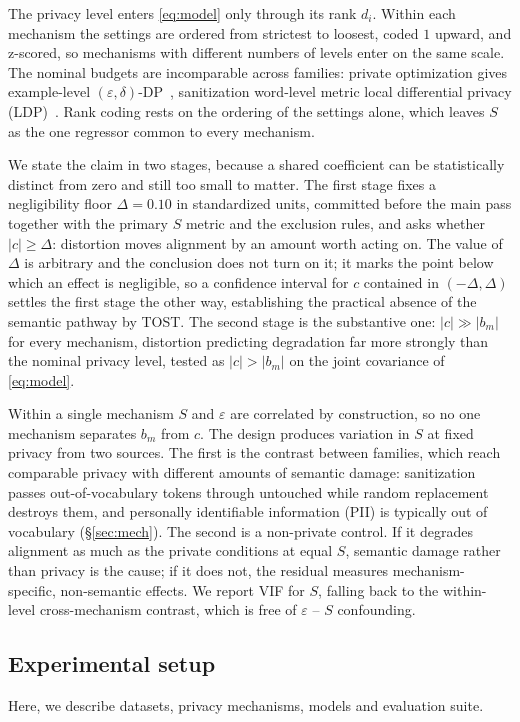 The privacy level enters \eqref{eq:model} only through its rank $d_i$.
Within each mechanism the settings are ordered from strictest to loosest,
coded $1$ upward,
and z-scored,
so mechanisms with different numbers of levels enter on the same scale.
The nominal budgets are incomparable across families:
private optimization gives example-level $(\varepsilon, \delta)$-DP~\citep{abadi2016deep},
sanitization word-level metric local differential privacy (LDP)~\citep{chatzikokolakis2013broadening}.
Rank coding rests on the ordering of the settings alone,
which leaves $S$ as the one regressor common to every mechanism.

We state the claim in two stages,
because a shared coefficient can be statistically distinct from zero and still too small to matter.
The first stage fixes a negligibility floor $\Delta = 0.10$ in standardized units,
committed before the main pass together with the primary $S$ metric and the exclusion rules,
and asks whether $|c| \ge \Delta$:
distortion moves alignment by an amount worth acting on.
The value of $\Delta$ is arbitrary and the conclusion does not turn on it;
it marks the point below which an effect is negligible,
so a confidence interval for $c$ contained in $(-\Delta, \Delta)$ settles the first stage the other way,
establishing the practical absence of the semantic pathway by TOST.
The second stage is the substantive one:
$|c| \gg |b_m|$ for every mechanism,
distortion predicting degradation far more strongly than the nominal privacy level,
tested as $|c| > |b_m|$ on the joint covariance of \eqref{eq:model}.

Within a single mechanism $S$ and $\varepsilon$ are correlated by construction,
so no one mechanism separates $b_m$ from $c$. The design produces variation in $S$ at fixed privacy from two sources.
The first is the contrast between families,
which reach comparable privacy with different amounts of semantic damage:
sanitization passes out-of-vocabulary tokens through untouched while random replacement destroys them,
and personally identifiable information (PII) is typically out of vocabulary (\S\ref{sec:mech}).
The second is a non-private control.
If it degrades alignment as much as the private conditions at equal $S$,
semantic damage rather than privacy is the cause;
if it does not,
the residual measures mechanism-specific,
non-semantic effects.
We report VIF for $S$,
falling back to the within-level cross-mechanism contrast,
which is free of $\varepsilon$ -- $S$ confounding.

\subsection{\label{apx:extsetup}Experimental setup}
Here, we describe datasets,
privacy mechanisms,
models and evaluation suite.

